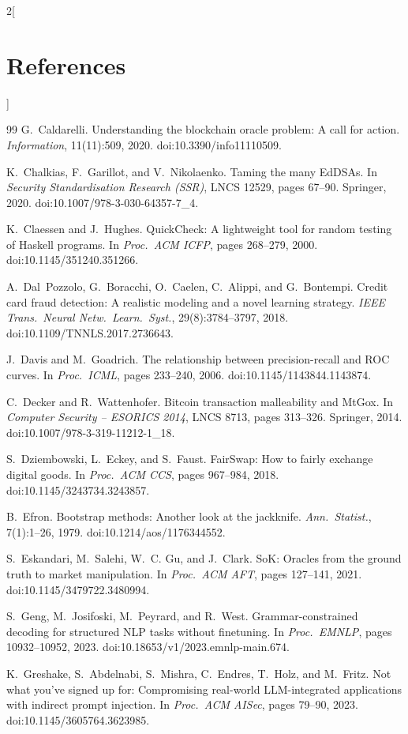 \documentclass[10pt,a4paper]{article}
\theoremstyle{tight}
\begin{document}
{\begin{multicols}{2}[\section*{\large References}]
\begin{thebibliography}{99}
 G.~Caldarelli. Understanding the blockchain oracle problem: A call for action.
\emph{Information}, 11(11):509, 2020. doi:10.3390/info11110509.

 K.~Chalkias, F.~Garillot, and V.~Nikolaenko. Taming the many EdDSAs. In \emph{Security
Standardisation Research (SSR)}, LNCS 12529, pages 67--90. Springer, 2020. doi:10.1007/978-3-030-64357-7\_4.

 K.~Claessen and J.~Hughes. QuickCheck: A lightweight tool for random testing of Haskell
programs. In \emph{Proc.\ ACM ICFP}, pages 268--279, 2000. doi:10.1145/351240.351266.

 A.~Dal~Pozzolo, G.~Boracchi, O.~Caelen, C.~Alippi, and G.~Bontempi. Credit card fraud
detection: A realistic modeling and a novel learning strategy. \emph{IEEE Trans.\ Neural Netw.\ Learn.\ Syst.},
29(8):3784--3797, 2018. doi:10.1109/TNNLS.2017.2736643.

 J.~Davis and M.~Goadrich. The relationship between precision-recall and ROC curves. In
\emph{Proc.\ ICML}, pages 233--240, 2006. doi:10.1145/1143844.1143874.

 C.~Decker and R.~Wattenhofer. Bitcoin transaction malleability and MtGox. In \emph{Computer
Security -- ESORICS 2014}, LNCS 8713, pages 313--326. Springer, 2014. doi:10.1007/978-3-319-11212-1\_18.

 S.~Dziembowski, L.~Eckey, and S.~Faust. FairSwap: How to fairly exchange digital goods.
In \emph{Proc.\ ACM CCS}, pages 967--984, 2018. doi:10.1145/3243734.3243857.

 B.~Efron. Bootstrap methods: Another look at the jackknife. \emph{Ann.\ Statist.}, 7(1):1--26,
1979. doi:10.1214/aos/1176344552.

 S.~Eskandari, M.~Salehi, W.~C. Gu, and J.~Clark. SoK: Oracles from the ground truth to
market manipulation. In \emph{Proc.\ ACM AFT}, pages 127--141, 2021. doi:10.1145/3479722.3480994.

 S.~Geng, M.~Josifoski, M.~Peyrard, and R.~West. Grammar-constrained decoding for structured NLP
tasks without finetuning. In \emph{Proc.\ EMNLP}, pages 10932--10952, 2023. doi:10.18653/v1/2023.emnlp-main.674.

 K.~Greshake, S.~Abdelnabi, S.~Mishra, C.~Endres, T.~Holz, and M.~Fritz. Not what you've
signed up for: Compromising real-world LLM-integrated applications with indirect prompt injection. In \emph{Proc.\
ACM AISec}, pages 79--90, 2023. doi:10.1145/3605764.3623985.


\end{thebibliography}
\end{multicols}}
\end{document}
